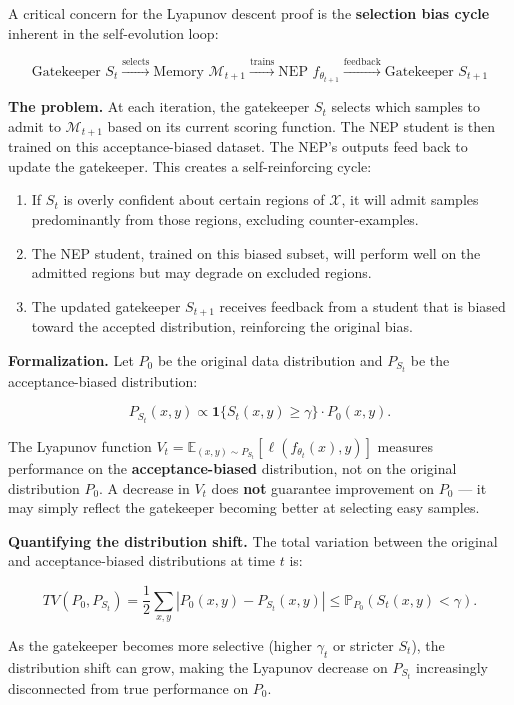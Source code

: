 \documentclass[
  12pt,
]{article}
\providecommand{\tightlist}{%
  \setlength{\itemsep}{0pt}\setlength{\parskip}{0pt}}
\begin{document}
A critical concern for the Lyapunov descent proof is the
\textbf{selection bias cycle} inherent in the self-evolution loop:

\[\text{Gatekeeper } S_t \xrightarrow{\text{selects}} \text{Memory } \mathcal{M}_{t+1} \xrightarrow{\text{trains}} \text{NEP } f_{\theta_{t+1}} \xrightarrow{\text{feedback}} \text{Gatekeeper } S_{t+1}\]

\textbf{The problem.} At each iteration, the gatekeeper \(S_t\) selects
which samples to admit to \(\mathcal{M}_{t+1}\) based on its current
scoring function. The NEP student is then trained on this
acceptance-biased dataset. The NEP's outputs feed back to update the
gatekeeper. This creates a self-reinforcing cycle:

\begin{enumerate}
\def\labelenumi{\arabic{enumi}.}
\tightlist
\item
  If \(S_t\) is overly confident about certain regions of
  \(\mathcal{X}\), it will admit samples predominantly from those
  regions, excluding counter-examples.
\item
  The NEP student, trained on this biased subset, will perform well on
  the admitted regions but may degrade on excluded regions.
\item
  The updated gatekeeper \(S_{t+1}\) receives feedback from a student
  that is biased toward the accepted distribution, reinforcing the
  original bias.
\end{enumerate}

\textbf{Formalization.} Let \(P_0\) be the original data distribution
and \(P_{S_t}\) be the acceptance-biased distribution:

\[P_{S_t}(x,y) \propto \mathbf{1}\{S_t(x,y) \geq \gamma\} \cdot P_0(x,y).\]

The Lyapunov function
\(V_t = \mathbb{E}_{(x,y) \sim P_{S_t}}[\ell(f_{\theta_t}(x), y)]\)
measures performance on the \textbf{acceptance-biased} distribution, not
on the original distribution \(P_0\). A decrease in \(V_t\) does
\textbf{not} guarantee improvement on \(P_0\) --- it may simply reflect
the gatekeeper becoming better at selecting easy samples.

\textbf{Quantifying the distribution shift.} The total variation between
the original and acceptance-biased distributions at time \(t\) is:

\[TV(P_0, P_{S_t}) = \frac{1}{2} \sum_{x,y} |P_0(x,y) - P_{S_t}(x,y)| \leq \mathbb{P}_{P_0}(S_t(x,y) < \gamma).\]

As the gatekeeper becomes more selective (higher \(\gamma_t\) or
stricter \(S_t\)), the distribution shift can grow, making the Lyapunov
decrease on \(P_{S_t}\) increasingly disconnected from true performance
on \(P_0\).
\end{document}
